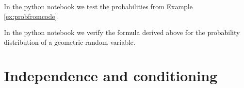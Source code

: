 \begin{example}
In the python notebook we test the probabilities from Example \ref{ex:probfromcode}. 
\end{example}

\begin{example}
In the python notebook we verify the formula derived above for the probability distribution of a geometric random variable. 
\end{example}

\section{Independence and conditioning}



